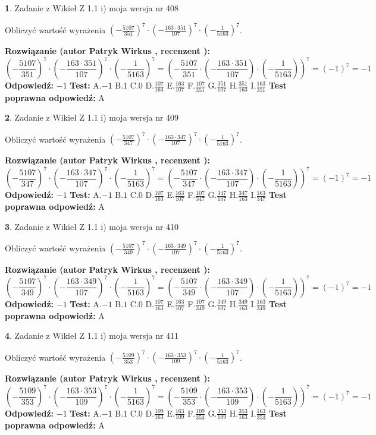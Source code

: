 \documentclass[12pt, a4paper]{article}
\theoremstyle{definition} %
\newtheorem{zad}{}
\newcommand{\zadStart}[1]{\begin{zad}#1\newline}
\newcommand{\zadStop}{\end{zad}}
\newcommand{\rozwStart}[2]{\noindent \textbf{Rozwiązanie (autor #1 , recenzent #2): }\newline}
\newcommand{\rozwStop}{\newline}
\newcommand{\odpStart}{\noindent \textbf{Odpowiedź:}\newline}
\newcommand{\odpStop}{\newline}
\newcommand{\testStart}{\noindent \textbf{Test:}\newline}
\newcommand{\testStop}{\newline}
\newcommand{\kluczStart}{\noindent \textbf{Test poprawna odpowiedź:}\newline}
\newcommand{\kluczStop}{\newline}
\begin{document}
\zadStart{Zadanie z Wikieł Z 1.1 i) moja wersja nr 408}

Obliczyć wartość wyrażenia $(-\frac{5107}{351})^{7} \cdot (-\frac{163 \cdot 351}{107})^{7} \cdot (-\frac{1}{5163})^{7}$.
\zadStop
\rozwStart{Patryk Wirkus}{}
$$(-\frac{5107}{351})^{7} \cdot (-\frac{163 \cdot 351}{107})^{7} \cdot (-\frac{1}{5163})^{7} = (-\frac{5107}{351} \cdot (-\frac{163 \cdot 351}{107}) \cdot (-\frac{1}{5163}))^{7} = (-1)^{7} = -1$$
\rozwStop
\odpStart
$-1$
\odpStop
\testStart
A.$-1$ B.$1$ C.$0$ D.$\frac{107}{163}$ E.$\frac{163}{107}$
F.$\frac{107}{351}$ G.$\frac{351}{107}$
H.$\frac{351}{163}$
I.$\frac{163}{351}$
\testStop
\kluczStart
A
\kluczStop



\zadStart{Zadanie z Wikieł Z 1.1 i) moja wersja nr 409}

Obliczyć wartość wyrażenia $(-\frac{5107}{347})^{7} \cdot (-\frac{163 \cdot 347}{107})^{7} \cdot (-\frac{1}{5163})^{7}$.
\zadStop
\rozwStart{Patryk Wirkus}{}
$$(-\frac{5107}{347})^{7} \cdot (-\frac{163 \cdot 347}{107})^{7} \cdot (-\frac{1}{5163})^{7} = (-\frac{5107}{347} \cdot (-\frac{163 \cdot 347}{107}) \cdot (-\frac{1}{5163}))^{7} = (-1)^{7} = -1$$
\rozwStop
\odpStart
$-1$
\odpStop
\testStart
A.$-1$ B.$1$ C.$0$ D.$\frac{107}{163}$ E.$\frac{163}{107}$
F.$\frac{107}{347}$ G.$\frac{347}{107}$
H.$\frac{347}{163}$
I.$\frac{163}{347}$
\testStop
\kluczStart
A
\kluczStop



\zadStart{Zadanie z Wikieł Z 1.1 i) moja wersja nr 410}

Obliczyć wartość wyrażenia $(-\frac{5107}{349})^{7} \cdot (-\frac{163 \cdot 349}{107})^{7} \cdot (-\frac{1}{5163})^{7}$.
\zadStop
\rozwStart{Patryk Wirkus}{}
$$(-\frac{5107}{349})^{7} \cdot (-\frac{163 \cdot 349}{107})^{7} \cdot (-\frac{1}{5163})^{7} = (-\frac{5107}{349} \cdot (-\frac{163 \cdot 349}{107}) \cdot (-\frac{1}{5163}))^{7} = (-1)^{7} = -1$$
\rozwStop
\odpStart
$-1$
\odpStop
\testStart
A.$-1$ B.$1$ C.$0$ D.$\frac{107}{163}$ E.$\frac{163}{107}$
F.$\frac{107}{349}$ G.$\frac{349}{107}$
H.$\frac{349}{163}$
I.$\frac{163}{349}$
\testStop
\kluczStart
A
\kluczStop



\zadStart{Zadanie z Wikieł Z 1.1 i) moja wersja nr 411}

Obliczyć wartość wyrażenia $(-\frac{5109}{353})^{7} \cdot (-\frac{163 \cdot 353}{109})^{7} \cdot (-\frac{1}{5163})^{7}$.
\zadStop
\rozwStart{Patryk Wirkus}{}
$$(-\frac{5109}{353})^{7} \cdot (-\frac{163 \cdot 353}{109})^{7} \cdot (-\frac{1}{5163})^{7} = (-\frac{5109}{353} \cdot (-\frac{163 \cdot 353}{109}) \cdot (-\frac{1}{5163}))^{7} = (-1)^{7} = -1$$
\rozwStop
\odpStart
$-1$
\odpStop
\testStart
A.$-1$ B.$1$ C.$0$ D.$\frac{109}{163}$ E.$\frac{163}{109}$
F.$\frac{109}{353}$ G.$\frac{353}{109}$
H.$\frac{353}{163}$
I.$\frac{163}{353}$
\testStop
\kluczStart
A
\kluczStop
\end{document}
